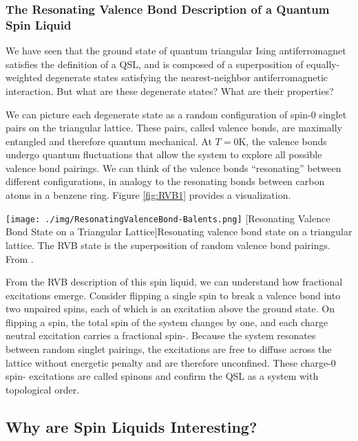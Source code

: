 \subsubsection{The Resonating Valence Bond Description of a Quantum Spin Liquid}

We have seen that the ground state of quantum triangular Ising antiferromagnet satisfies the definition of a QSL, and is composed of a superposition of equally-weighted degenerate states satisfying the nearest-neighbor antiferromagnetic interaction. But what are these degenerate states? What are their properties?

We can picture each degenerate state as a random configuration of spin-0 singlet pairs on the triangular lattice. These pairs, called valence bonds, are maximally entangled and therefore quantum mechanical. At $T = 0$K, the valence bonds undergo quantum fluctuations that allow the system to explore all possible valence bond pairings. We can think of the valence bonds ``resonating'' between different configurations, in analogy to the resonating bonds between carbon atoms in a benzene ring. Figure \ref{fig:RVB1} provides a visualization.

\begin{centering}
\texttt{[image: ./img/ResonatingValenceBond-Balents.png]}
  \captionsetup{width=0.75\textwidth}
  [Resonating Valence Bond State on a Triangular Lattice]{Resonating valence bond state on a triangular lattice. The RVB state is the superposition of random valence bond pairings. From \cite{Balents2010}.}
  \label{fig:RVB1}
\end{centering}

From the RVB description of this spin liquid, we can understand how fractional excitations emerge. Consider flipping a single spin to break a valence bond into two unpaired spins, each of which is an excitation above the ground state. On flipping a spin, the total spin of the system changes by one, and each charge neutral excitation carries a fractional spin-\textonehalf{}. Because the system resonates between random singlet pairings, the excitations are free to diffuse across the lattice without energetic penalty and are therefore unconfined. These charge-0 spin-\textonehalf{} excitations are called spinons and confirm the QSL as a system with topological order.

\subsection{Why are Spin Liquids Interesting?} \label{whyqslinteresting}

